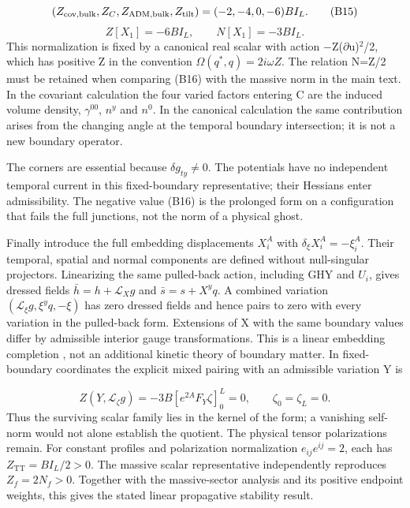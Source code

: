 \documentclass[11pt,a4paper]{article}
\begin{document}
\begin{equation}
(Z_{\rm cov,bulk},Z_C,Z_{\rm ADM,bulk},Z_{\rm tilt})=(-2,-4,0,-6)BI_L.\tag{B15}
\end{equation}
\begin{equation}
Z[X_1]=-6BI_L,\qquad N[X_1]=-3BI_L.\tag{B16}
\end{equation}
This normalization is fixed by a canonical real scalar with action \ensuremath{-}Z(\ensuremath{\partial}u)\ensuremath{{}^{2}}/2, which has positive Z in the convention \ensuremath{\Omega(q^*,q)=2i\omega Z}. The relation N=Z/2 must be retained when comparing (B16) with the massive norm in the main text. In the covariant calculation the four varied factors entering C are the induced volume density, \ensuremath{\gamma^{00}}, \ensuremath{n^y} and \ensuremath{n^0}. In the canonical calculation the same contribution arises from the changing angle at the temporal boundary intersection; it is not a new boundary operator.

The corners are essential because \ensuremath{\delta g_{ty}\ne0}. The potentials have no independent temporal current in this fixed-boundary representative; their Hessians enter admissibility. The negative value (B16) is the prolonged form on a configuration that fails the full junctions, not the norm of a physical ghost.

Finally introduce the full embedding displacements \ensuremath{X_i^A} with \ensuremath{\delta_\xi X_i^A=-\xi_i^A}. Their temporal, spatial and normal components are defined without null-singular projectors. Linearizing the same pulled-back action, including GHY and \ensuremath{U_i}, gives dressed fields \ensuremath{\bar h=h+\mathcal L_X g} and \ensuremath{\bar s=s+X^yq}. A combined variation \ensuremath{(\mathcal L_\xi g,\xi^yq,-\xi)} has zero dressed fields and hence pairs to zero with every variation in the pulled-back form. Extensions of X with the same boundary values differ by admissible interior gauge transformations. This is a linear embedding completion \cite{ref22}, not an additional kinetic theory of boundary matter. In fixed-boundary coordinates the explicit mixed pairing with an admissible variation Y is

\begin{equation}
Z(Y,\mathcal L_\zeta g)=-3B[e^{2A}F_Y\zeta]_0^L=0,\qquad \zeta_0=\zeta_L=0.\tag{B17}
\end{equation}
Thus the surviving scalar family lies in the kernel of the form; a vanishing self-norm would not alone establish the quotient. The physical tensor polarizations remain. For constant profiles and polarization normalization \ensuremath{e_{ij}e^{ij}=2}, each has \ensuremath{Z_{\mathrm{TT}}=BI_L/2>0}. The massive scalar representative independently reproduces \ensuremath{Z_f=2N_f>0}. Together with the massive-sector analysis and its positive endpoint weights, this gives the stated linear propagative stability result.
\end{document}
